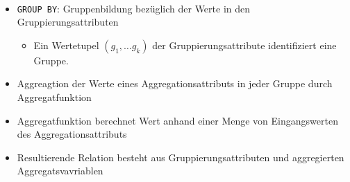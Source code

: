 \begin{frame}[fragile]
\frametitle{\insertsection}
\framesubtitle{\insertsubsection}
\onslide
{}\\[4pt]
\begin{itemize}
\item \texttt{GROUP BY}: Gruppenbildung bezüglich der Werte in den Gruppierungsattributen
\begin{itemize}
\item Ein Wertetupel $(g_1,\ldots g_k)$ der Gruppierungsattribute identifiziert eine Gruppe.
\end{itemize}
\item Aggreagtion der Werte eines Aggregationsattributs in jeder Gruppe durch Aggregatfunktion
\pause
\item Aggregatfunktion berechnet Wert anhand einer Menge von Eingangswerten des Aggregationsattributs
\pause
\item Resultierende Relation besteht aus Gruppierungsattributen und aggregierten Aggregatsvavriablen
\end{itemize}
\end{frame}

